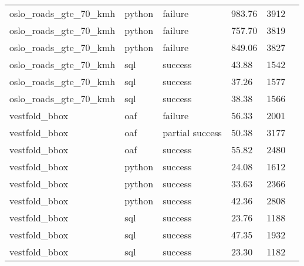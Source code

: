 \begin{longtable}{lp{1.8cm}p{1.8cm}p{1.8cm}p{1.8cm}p{1.8cm}}
    oslo\_roads\_gte\_70\_kmh  & python                       & failure          & 983.76                        & 3912            \\
    oslo\_roads\_gte\_70\_kmh  & python                       & failure          & 757.70                        & 3819            \\
    oslo\_roads\_gte\_70\_kmh  & python                       & failure          & 849.06                        & 3827            \\
    oslo\_roads\_gte\_70\_kmh  & sql                          & success          & 43.88                         & 1542            \\
    oslo\_roads\_gte\_70\_kmh  & sql                          & success          & 37.26                         & 1577            \\
    oslo\_roads\_gte\_70\_kmh  & sql                          & success          & 38.38                         & 1566            \\
    vestfold\_bbox             & oaf                          & failure          & 56.33                         & 2001            \\
    vestfold\_bbox             & oaf                          & partial success  & 50.38                         & 3177            \\
    vestfold\_bbox             & oaf                          & success          & 55.82                         & 2480            \\
    vestfold\_bbox             & python                       & success          & 24.08                         & 1612            \\
    vestfold\_bbox             & python                       & success          & 33.63                         & 2366            \\
    vestfold\_bbox             & python                       & success          & 42.36                         & 2808            \\
    vestfold\_bbox             & sql                          & success          & 23.76                         & 1188            \\
    vestfold\_bbox             & sql                          & success          & 47.35                         & 1932            \\
    vestfold\_bbox             & sql                          & success          & 23.30                         & 1182            \\

\end{longtable}
